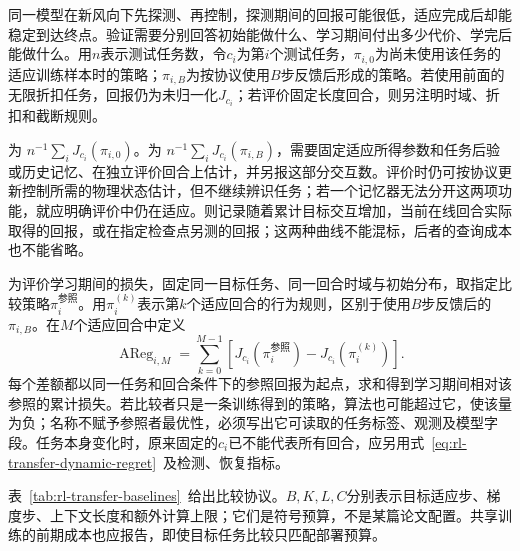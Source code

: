 同一模型在新风向下先探测、再控制，探测期间的回报可能很低，适应完成后却能稳定到达终点。验证需要分别回答初始能做什么、学习期间付出多少代价、学完后能做什么。用$n$表示测试任务数，令$c_i$为第$i$个测试任务，$\pi_{i,0}$为尚未使用该任务的适应训练样本时的策略；$\pi_{i,B}$为按协议使用$B$步反馈后形成的策略。若使用前面的无限折扣任务，回报仍为未归一化$J_{c_i}$；若评价固定长度回合，则另注明时域、折扣和截断规则。

为
$n^{-1}\sum_iJ_{c_i}(\pi_{i,0})$。为
$n^{-1}\sum_iJ_{c_i}(\pi_{i,B})$，需要固定适应所得参数和任务后验或历史记忆、在独立评价回合上估计，并另报这部分交互数。评价时仍可按协议更新控制所需的物理状态估计，但不继续辨识任务；若一个记忆器无法分开这两项功能，就应明确评价中仍在适应。则记录随着累计目标交互增加，当前在线回合实际取得的回报，或在指定检查点另测的回报；这两种曲线不能混标，后者的查询成本也不能省略。

为评价学习期间的损失，固定同一目标任务、同一回合时域与初始分布，取指定比较策略$\pi_i^{\text{参照}}$。用$\pi_i^{(k)}$表示第$k$个适应回合的行为规则，区别于使用$B$步反馈后的$\pi_{i,B}$。在$M$个适应回合中定义
\begin{equation}
 \operatorname{AReg}_{i,M}
 =\sum_{k=0}^{M-1}
 \left[J_{c_i}(\pi_i^{\text{参照}})
       -J_{c_i}(\pi_i^{(k)})\right].
 \label{eq:rl-transfer-adaptation-regret}
\end{equation}
每个差额都以同一任务和回合条件下的参照回报为起点，求和得到学习期间相对该参照的累计损失。若比较者只是一条训练得到的策略，算法也可能超过它，使该量为负；名称不赋予参照者最优性，必须写出它可读取的任务标签、观测及模型字段。任务本身变化时，原来固定的$c_i$已不能代表所有回合，应另用式~\eqref{eq:rl-transfer-dynamic-regret}~及检测、恢复指标。

表~\ref{tab:rl-transfer-baselines}~给出比较协议。$B,K,L,C$分别表示目标适应步、梯度步、上下文长度和额外计算上限；它们是符号预算，不是某篇论文配置。共享训练的前期成本也应报告，即使目标任务比较只匹配部署预算。

